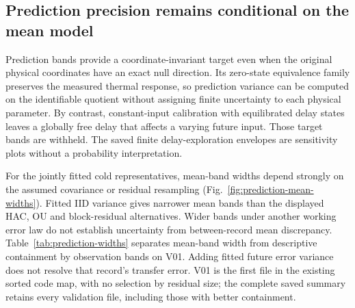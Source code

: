 \documentclass[11pt]{article}
\begin{document}
\subsection{Prediction precision remains conditional on the mean model}
Prediction bands provide a coordinate-invariant target even when the original
physical coordinates have an exact null direction. Its zero-state equivalence
family preserves the measured thermal response, so prediction variance can be
computed on the identifiable quotient without assigning finite uncertainty to
each physical parameter. By contrast, constant-input calibration with
equilibrated delay states leaves a globally free delay that affects a varying
future input. Those target bands are withheld. The saved finite delay-exploration
envelopes are sensitivity plots without a probability interpretation.

For the jointly fitted cold representatives, mean-band widths depend strongly
on the assumed covariance or residual resampling
(Fig.~\ref{fig:prediction-mean-widths}). Fitted IID variance gives narrower mean
bands than the displayed HAC, OU and block-residual alternatives. Wider bands
under another working error law do not establish uncertainty from between-record
mean discrepancy. Table~\ref{tab:prediction-widths} separates mean-band width
from descriptive containment by observation bands on V01. Adding fitted future
error variance does not resolve that record's transfer error. V01 is the first
file in the existing sorted code map, with no selection by residual size; the
complete saved summary retains every validation file, including those with
better containment.
\end{document}
